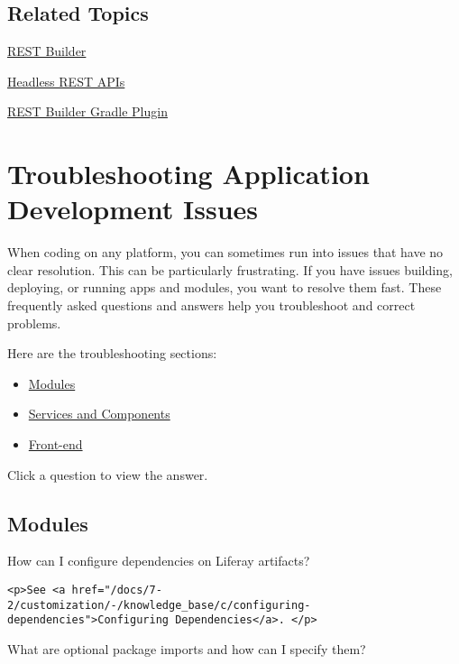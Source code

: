 \section{Related Topics}\label{related-topics-26}

\href{/docs/7-2/appdev/-/knowledge_base/a/rest-builder}{REST Builder}

\href{/docs/7-2/frameworks/-/knowledge_base/f/headless-rest-apis}{Headless
REST APIs}

\href{/docs/7-2/reference/-/knowledge_base/r/rest-builder-gradle-plugin}{REST
Builder Gradle Plugin}

\chapter{Troubleshooting Application Development
Issues}\label{troubleshooting-application-development-issues}

When coding on any platform, you can sometimes run into issues that have
no clear resolution. This can be particularly frustrating. If you have
issues building, deploying, or running apps and modules, you want to
resolve them fast. These frequently asked questions and answers help you
troubleshoot and correct problems.

Here are the troubleshooting sections:

\begin{itemize}
\tightlist
\item
  \hyperref[modules]{Modules}
\item
  \hyperref[services-and-components]{Services and Components}
\item
  \href{/docs/7-2/appdev/-/knowledge_base/a/troubleshooting-front-end-development-issues}{Front-end}
\end{itemize}

Click a question to view the answer.

\section{Modules}\label{modules}

{How can I configure dependencies on Liferay artifacts?~{}}

\begin{verbatim}
<p>See <a href="/docs/7-2/customization/-/knowledge_base/c/configuring-dependencies">Configuring Dependencies</a>. </p>
\end{verbatim}

{What are optional package imports and how can I specify them?~{}}

